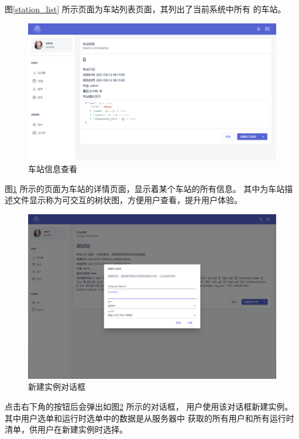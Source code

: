 图\ref{station_list} 所示页面为车站列表页面，其列出了当前系统中所有
的车站。

\begin{figure}[htbp!]
  \centering
  \includegraphics[width=\textwidth]{figures/png/station_info.png}
  \caption{\label{station_info}车站信息查看}
\end{figure}

图\ref{station_info} 所示的页面为车站的详情页面，显示着某个车站的所有信息。
其中为车站描述文件显示称为可交互的树状图，方便用户查看，提升用户体验。

\begin{figure}[htbp!]
  \centering
  \includegraphics[width=\textwidth]{figures/png/dialog.png}
  \caption{\label{dialog}新建实例对话框}
\end{figure}

点击右下角的按钮后会弹出如图\ref{dialog} 所示的对话框，
用户使用该对话框新建实例。其中用户选单和运行时选单中的数据是从服务器中
获取的所有用户和所有运行时清单，供用户在新建实例时选择。

